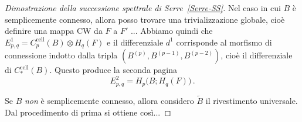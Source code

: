 \begin{proof}[Dimostrazione della successione spettrale di Serre~\ref{Serre-SS}]
		Nel caso in cui $B$ è semplicemente connesso,
		allora posso trovare una trivializzazione globale,
		cioè definire una mappa CW da $F$ a $F'$  ...
		Abbiamo quindi che $E^{1}_{p,q} = C^{\mathrm{cell}}_{p}(B) \otimes H_{q}(F)$
		e il differenziale $d^{1}$ corrisponde al morfismo di connessione indotto
		dalla tripla $(B^{(p)},B^{(p-1)},B^{(p-2)})$, 
		cioè il differenziale di $C^{\mathrm{cell}}_{*}(B)$.
		Questo produce la seconda pagina
		\begin{equation*}
			E^{2}_{p,q} = H_{p}\big(B; H_{q}(F)\big)\,.
		\end{equation*}
		
		Se $B$ \emph{non} è semplicemente connesso,
		allora considero $\widetilde{B}$ il rivestimento universale.
		Dal procedimento di prima si ottiene così...
	\end{proof}
	
